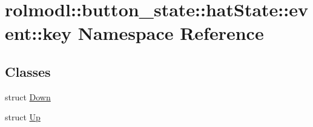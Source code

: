 \hypertarget{namespacerolmodl_1_1button__state_1_1hat_state_1_1event_1_1key}{}\section{rolmodl\+::button\+\_\+state\+::hat\+State\+::event\+::key Namespace Reference}
\label{namespacerolmodl_1_1button__state_1_1hat_state_1_1event_1_1key}
\subsection*{Classes}
\begin{DoxyCompactItemize}
\item 
struct \mbox{\hyperlink{structrolmodl_1_1button__state_1_1hat_state_1_1event_1_1key_1_1_down}{Down}}
\item 
struct \mbox{\hyperlink{structrolmodl_1_1button__state_1_1hat_state_1_1event_1_1key_1_1_up}{Up}}
\end{DoxyCompactItemize}
